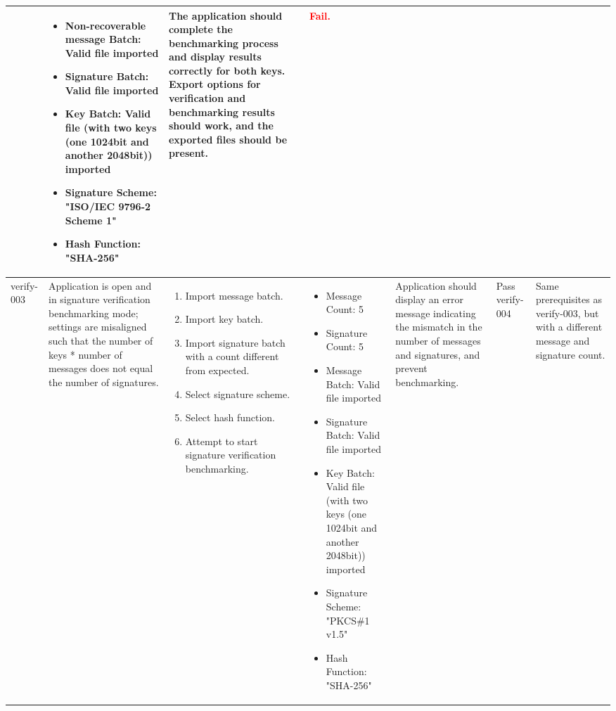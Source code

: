 \documentclass[]{final_report}
\theoremstyle{definition}
\begin{document}
\begin{longtable}{|l|p{2.5cm}|p{2.8cm}|p{3cm}|p{2cm}|p{1.5cm}|}
\begin{enumerate}
  \end{enumerate} & 
  \begin{itemize}
    \item Non-recoverable message Batch: Valid file imported
     \item Signature Batch: Valid file imported
    \item Key Batch: Valid file  (with two keys (one 1024bit and another 2048bit)) imported 
    \item Signature Scheme: "ISO/IEC 9796-2 Scheme 1"
    \item Hash Function: "SHA-256"
  \end{itemize} &
  The application should complete the benchmarking process and display results correctly for both keys. Export options for verification and benchmarking results should work, and the exported files should be present. &  \textcolor{red}{Fail.} \\
  \hline 
  verify-003 & Application is open and in signature verification benchmarking mode; settings are misaligned such that the number of keys * number of messages does not equal the number of signatures. &
\begin{enumerate}
\item Import message batch.
\item Import key batch.
\item Import signature batch with a count different from expected.
\item Select signature scheme.
\item Select hash function.
\item Attempt to start signature verification benchmarking.
\end{enumerate} &
\begin{itemize}
\item Message Count: 5
\item Signature Count: 5
\item Message Batch: Valid file imported
\item Signature Batch: Valid file imported
\item Key Batch: Valid file  (with two keys (one 1024bit and another 2048bit)) imported 
\item Signature Scheme: "PKCS\#1 v1.5"
\item Hash Function: "SHA-256"
\end{itemize} &
Application should display an error message indicating the mismatch in the number of messages and signatures, and prevent benchmarking. & Pass \
\hline
verify-004 & Same prerequisites as verify-003, but with a different message and signature count. &

\end{longtable}
\end{document}
